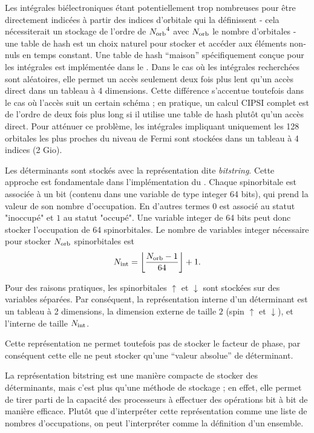 \documentclass[./thesis.tex]{subfiles}
\begin{document}
Les intégrales biélectroniques étant potentiellement trop nombreuses pour être directement indicées à partir des indices d'orbitale qui la définissent - cela nécessiterait un stockage de l'ordre de ${N_\text{orb}}^4$ avec ${N_\text{orb}}$ le nombre d'orbitales - une table de hash est un choix naturel pour stocker et accéder aux éléments non-nuls en temps constant. Une table de hash ``maison'' spécifiquement conçue pour les intégrales est implémentée dans le \QP. Dans le cas où les intégrales recherchées sont aléatoires, elle permet un accès seulement deux fois plus lent qu'un accès direct dans un tableau à 4 dimensions. Cette différence s'accentue toutefois dans le cas où l'accès suit un certain schéma ; en pratique, un calcul CIPSI complet est de l'ordre de deux fois plus long si il utilise une table de hash plutôt qu'un accès direct. Pour atténuer ce problème, les intégrales impliquant uniquement les 128 orbitales les plus proches du niveau de Fermi sont stockées dans un tableau à 4 indices (2 Gio).

Les déterminants sont stockés avec la représentation dite \emph{bitstring}. Cette approche est fondamentale dans l'implémentation du \QP. Chaque spinorbitale est associée à un bit (contenu dans une variable de type integer 64 bits), qui prend la valeur de son nombre d'occupation. En d'autres termes $0$ est associé au statut "inoccupé" et $1$ au statut "occupé". Une variable integer de 64 bits peut donc stocker l'occupation de 64 spinorbitales. Le nombre de variables integer nécessaire pour stocker ${N_\text{orb}}$ spinorbitales est
\begin{equation}
{N_\text{int}} = \left \lfloor \frac{{N_\text{orb}}-1}{64} \right \rfloor + 1.
\end{equation}

Pour des raisons pratiques, les spinorbitales $\uparrow$ et $\downarrow$ sont stockées sur des variables séparées. Par conséquent, la représentation interne d'un déterminant est un tableau à 2 dimensions, la dimension externe de taille $2$ (spin $\uparrow$ et $\downarrow$), et l'interne de taille ${N_\text{int}}$.

Cette représentation ne permet toutefois pas de stocker le facteur de phase, par conséquent cette elle ne peut stocker qu'une ``valeur absolue'' de déterminant.

La représentation bitstring est une manière compacte de stocker des déterminants, mais c'est plus qu'une méthode de stockage ; en effet, elle permet de tirer parti de la capacité des processeurs à effectuer des opérations bit à bit de manière efficace. Plutôt que d'interpréter cette représentation comme une liste de nombres d'occupations, on peut l'interpréter comme la définition d'un ensemble.
\end{document}
